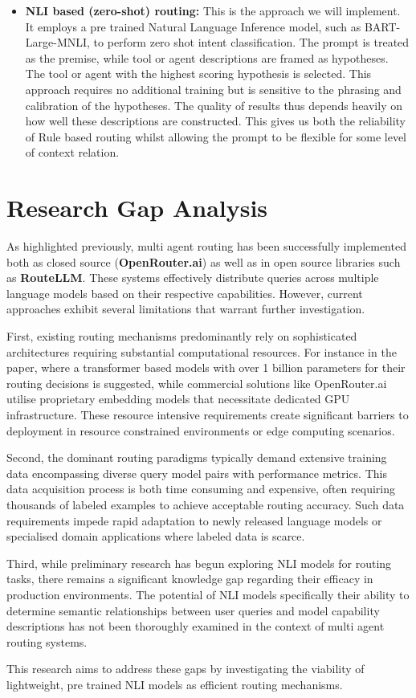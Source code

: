 \begin{itemize}
    \item \textbf{NLI based (zero-shot) routing:} This is the approach we will implement. It employs a pre trained Natural Language Inference model, such as BART-Large-MNLI, to perform zero shot intent classification. The prompt is treated as the premise, while tool or agent descriptions are framed as hypotheses. The tool or agent with the highest scoring hypothesis is selected. This approach requires no additional training but is sensitive to the phrasing and calibration of the hypotheses. The quality of results thus depends heavily on how well these descriptions are constructed. This gives us both the reliability of Rule based routing whilst allowing the prompt to be flexible for some level of context relation.
\end{itemize}

\section{Research Gap Analysis}

As highlighted previously, multi agent routing has been successfully implemented both as closed source (\textbf{OpenRouter.ai}) as well as in open source libraries such as \textbf{RouteLLM}. These systems effectively distribute queries across multiple language models based on their respective capabilities. However, current approaches exhibit several limitations that warrant further investigation.

First, existing routing mechanisms predominantly rely on sophisticated architectures requiring substantial computational resources. For instance in the paper, \cite{jiang2023activeretrievalaugmentedgeneration} where a transformer based models with over 1 billion parameters for their routing decisions is suggested, while commercial solutions like OpenRouter.ai utilise proprietary embedding models that necessitate dedicated GPU infrastructure. These resource intensive requirements create significant barriers to deployment in resource constrained environments or edge computing scenarios.

Second, the dominant routing paradigms typically demand extensive training data encompassing diverse query model pairs with performance metrics. This data acquisition process is both time consuming and expensive, often requiring thousands of labeled examples to achieve acceptable routing accuracy. Such data requirements impede rapid adaptation to newly released language models or specialised domain applications where labeled data is scarce.

Third, while preliminary research has begun exploring NLI models for routing tasks, there remains a significant knowledge gap regarding their efficacy in production environments. The potential of NLI models specifically their ability to determine semantic relationships between user queries and model capability descriptions has not been thoroughly examined in the context of multi agent routing systems.

This research aims to address these gaps by investigating the viability of lightweight, pre trained NLI models as efficient routing mechanisms. 